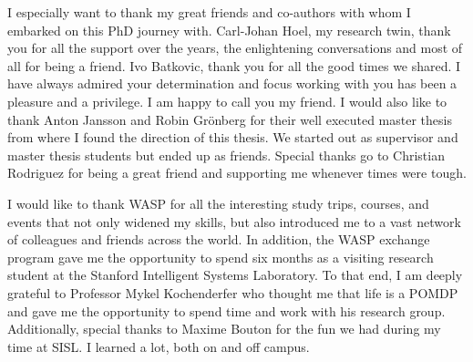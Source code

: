 I especially want to thank my great friends and co-authors with whom I embarked on this PhD journey with. Carl-Johan Hoel, my research twin, thank you for all the support over the years, the enlightening conversations and most of all for being a friend. %
Ivo Batkovic, thank you for all the good times we shared. I have always admired your determination and focus working with you has been a pleasure and a privilege. I am happy to call you my friend. 
I would also like to thank Anton Jansson and Robin Gr\"onberg for their well executed master thesis from where I found the direction of this thesis. We started out as supervisor and master thesis students but ended up as friends. 
Special thanks go to Christian Rodriguez for being a great friend and supporting me whenever times were tough.

I would like to thank WASP for all the interesting study trips, courses, and events that not only widened my skills, but also introduced me to a vast network of colleagues and friends across the world. In addition, the WASP exchange program gave me the opportunity to spend six months as a visiting research student at the Stanford Intelligent Systems Laboratory. To that end, I am deeply grateful to Professor Mykel Kochenderfer who thought me that life is a POMDP and gave me the opportunity to spend time and work with his research group. 
Additionally, special thanks to Maxime Bouton for the fun we had during my time at SISL. I learned a lot, both on and off campus. 




